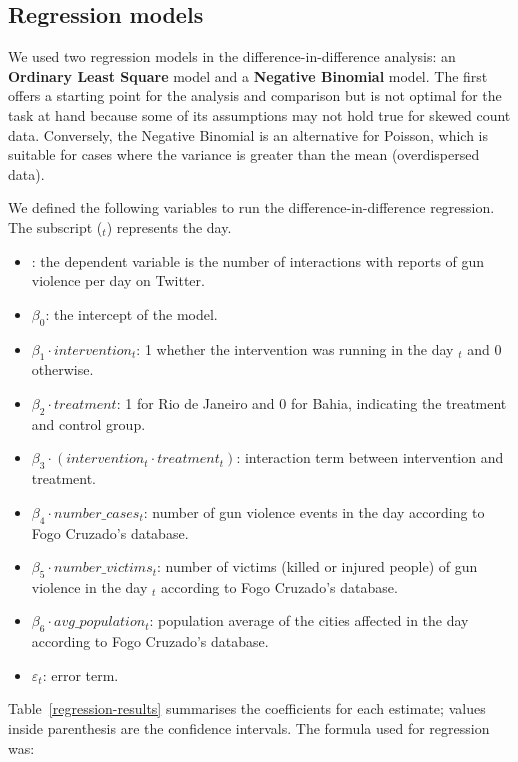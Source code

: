 \documentclass[11pt,letterpaper]{article}
\begin{document}
\subsection{Regression models}
We used two regression models in the difference-in-difference analysis: an \textbf{Ordinary Least Square} model and a \textbf{Negative Binomial} model. The first offers a starting point for the analysis and comparison but is not optimal for the task at hand because some of its assumptions may not hold true for skewed count data. Conversely, the Negative Binomial is an alternative for Poisson, which is suitable for cases where the variance is greater than the mean (overdispersed data). 

We defined the following variables to run the difference-in-difference regression. The subscript ($_t$) represents the day. 

\begin{itemize}
    \item {}: the dependent variable is the number of interactions with reports of gun violence per day on Twitter.
    \item $\beta_0$: the intercept of the model.
    \item $\beta_1 \cdot intervention_t$: 1 whether the intervention was running in the day $_t$ and 0 otherwise.
    \item $\beta_2 \cdot treatment$: 1 for Rio de Janeiro and 0 for Bahia, indicating the treatment and control group.
    \item $\beta_3 \cdot (intervention_t \cdot treatment_t)$: interaction term between intervention and treatment.
    \item $\beta_4 \cdot number\_cases_t $: number of gun violence events in the day according to Fogo Cruzado's database.
    \item $\beta_5 \cdot number\_victims_t$: number of victims (killed or injured people) of gun violence in the day $_t$  according to Fogo Cruzado's database.
    \item $\beta_6  \cdot avg\_population_t$: population average of the cities affected in the day according to Fogo Cruzado's database.
    \item $\varepsilon_t$: error term.
\end{itemize}

Table~\ref{regression-results} summarises the coefficients for each estimate; values inside parenthesis are the confidence intervals. The formula used for regression was:
\end{document}
